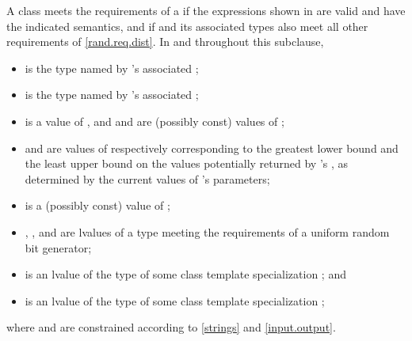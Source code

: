\pnum
A class 
meets the requirements
of a 
if the expressions shown
in 
are valid and have the indicated semantics,
and if  and its associated types
also meet all other requirements
of \ref{rand.req.dist}.
In  and throughout this subclause,
\begin{itemize}
  \item
     is the type named by
    's associated ;
  \item
     is the type named by
    's associated ;
  \item
     is a
    value of ,
    and
     and  are (possibly const) values of ;
  \item
     and 
    are values of 
    respectively corresponding to
    the greatest lower bound and the least upper bound
    on the values potentially returned by 's ,
    as determined by the current values of 's parameters;
  \item
     is a (possibly const) value of ;
  \item
    , , and  are lvalues of a type
    meeting the requirements
    of a uniform random bit generator;
  \item
     is an lvalue of the type of some class template specialization
     ;
  and
  \item
     is an lvalue of the type of some class template specialization
     ;
\end{itemize}
where  and  are constrained
according to \ref{strings} and \ref{input.output}.

